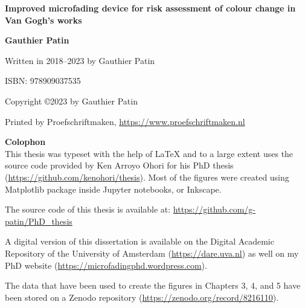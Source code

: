 


\begin{titlepage}
   \begin{center}
       \vspace*{4cm}

       \textbf{\Huge Improved microfading device for risk assessment of colour change in Van Gogh's works}
           
       \vspace{7cm}
       
       \textbf{\Large Gauthier Patin}          
              
   \end{center}
\end{titlepage}



\null%
\label{thesis:colophon}
\vfill
{}

Written in 2018--2023 by Gauthier Patin 

ISBN: 978909037535

Copyright \copyright \hspace{0.1cm}2023 by Gauthier Patin

Printed by Proefschriftmaken, \url{https://www.proefschriftmaken.nl}\\

\vspace{0.5cm}

\textbf{Colophon} \\

This thesis was typeset with the help of \LaTeX{} and to a large extent uses the source code provided by Ken Arroyo Ohori for his PhD thesis (\url{https://github.com/kenohori/thesis}). Most of the figures were created using Matplotlib package inside Jupyter notebooks, or Inkscape.

The source code of this thesis is available at: \url{https://github.com/g-patin/PhD_thesis}

A digital version of this dissertation is available on the Digital Academic Repository of the University of Amsterdam (\url{https://dare.uva.nl}) as well on my PhD website (\url{https://microfadingphd.wordpress.com}). 

The data that have been used to create the figures in Chapters 3, 4, and 5 have been stored on a Zenodo repository (\url{https://zenodo.org/record/8216110}). \\

